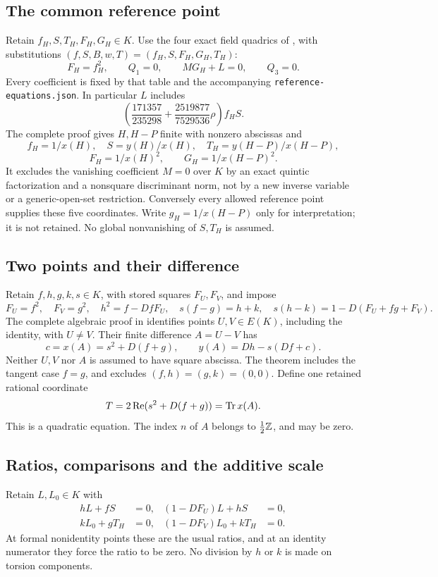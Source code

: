 \documentclass[11pt,a4paper]{article}
\begin{document}
\subsection{The common reference point}
Retain $f_H,S,T_H,F_H,G_H\in K$. Use the four exact field quadrics
of \cite[Theorem~1.1 and corrected coefficient table]{Compressed},
with substitutions $(f,S,B,w,T)=(f_H,S,F_H,G_H,T_H)$:
\[
 F_H=f_H^2,\qquad Q_1=0,\qquad M G_H+L=0,\qquad Q_3=0.
\]
Every coefficient is fixed by that table and the accompanying
\nolinkurl{reference-equations.json}. In particular $L$ includes
\[
 \left(\frac{171357}{235298}+\frac{2519877}{7529536}\rho\right)f_HS.
\]
The complete proof gives $H,H-P$ finite with nonzero abscissas and
\[
 f_H=1/x(H),\quad S=y(H)/x(H),\quad T_H=y(H-P)/x(H-P),
\]
\[
 F_H=1/x(H)^2,\qquad G_H=1/x(H-P)^2.
\]
It excludes the vanishing coefficient $M=0$ over $K$ by an exact
quintic factorization and a nonsquare discriminant norm, not by a
new inverse variable or a generic-open-set restriction. Conversely
every allowed reference point supplies these five coordinates.
Write $g_H=1/x(H-P)$ only for interpretation; it is not retained.
No global nonvanishing of $S,T_H$ is assumed.

\subsection{Two points and their difference}
Retain $f,h,g,k,s\in K$, with stored squares $F_U,F_V$, and impose
\begin{equation}\label{eq:pair}
 F_U=f^2,\quad F_V=g^2,\quad h^2=f-DfF_U,\quad
 s(f-g)=h+k,\quad s(h-k)=1-D(F_U+fg+F_V).
\end{equation}
The complete algebraic proof in \cite[Proposition 2.1]{TraceAll}
identifies points $U,V\in E(K)$, including the identity, with
$U\ne V$. Their finite difference $A=U-V$ has
\[
 c=x(A)=s^2+D(f+g),\qquad y(A)=Dh-s(Df+c).
\]
Neither $U,V$ nor $A$ is assumed to have square abscissa. The theorem
includes the tangent case $f=g$, and excludes $(f,h)=(g,k)=(0,0)$.
Define one retained rational coordinate
\begin{equation}\label{eq:traceheightcoord}
                           T=2\operatorname{Re}(s^2+D(f+g))=\operatorname{Tr} x(A).
\end{equation}
This is a quadratic equation. The index $n$ of $A$ belongs to
$\frac12\mathbb Z$, and may be zero.

\subsection{Ratios, comparisons and the additive scale}
Retain $L,L_0\in K$ with
\begin{align}
 hL+fS&=0,& (1-DF_U)L+hS&=0,\\
 kL_0+gT_H&=0,& (1-DF_V)L_0+kT_H&=0.\label{eq:ratios}
\end{align}
At formal nonidentity points these are the usual ratios, and at an
identity numerator they force the ratio to be zero. No division by
$h$ or $k$ is made on torsion components.
\end{document}
